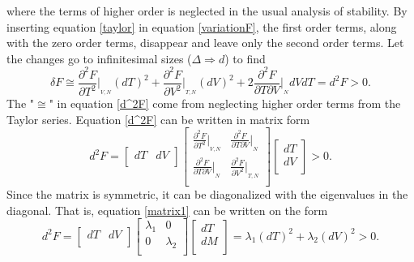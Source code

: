 where the terms of higher order is neglected in the usual analysis of stability. By inserting equation \eqref{taylor} in equation \eqref{variationF}, the first order terms, along with the zero order terms, disappear and leave only the second order terms. Let the changes go to infinitesimal sizes ($\Delta \Rightarrow d$) to find
\begin{equation}
	\delta F\cong\frac{\partial^2 F}{\partial T^2}\bigg|_{_{V,N}}(dT)^2+\frac{\partial^2 F}{\partial V^2}\bigg|_{_{T,N}}(dV)^2+2\frac{\partial^2 F}{\partial T \partial V}\bigg|_{_{N}}dVdT=d^2F > 0.
	\label{d^2F}
\end{equation} 
The "$\cong$" in equation \eqref{d^2F} come from neglecting higher order terms from the Taylor series. Equation \eqref{d^2F} can be written in matrix form
\begin{equation}
	d^2F=
	\begin{bmatrix}
		dT & dV\\
	\end{bmatrix}
	\begin{bmatrix}
		\frac{\partial^2 F}{\partial T^2}\bigg|_{_{V,N}}       & \frac{\partial^2 F}{\partial T \partial V}\bigg|_{_{N}}  \\
		\frac{\partial^2 F}{\partial T \partial V}\bigg|_{_{N}}       &
		\frac{\partial^2 F}{\partial V^2}\bigg|_{_{T,N}}
		\\
	\end{bmatrix}
	\begin{bmatrix}
		dT\\
		dV\\
	\end{bmatrix} > 0.
	\label{matrix1}
\end{equation} 
Since the matrix is symmetric, it can be diagonalized with the eigenvalues in the diagonal. That is, equation \eqref{matrix1} can be written on the form
\begin{equation}
	d^2F=
	\begin{bmatrix}
		dT & dV\\
	\end{bmatrix}
	\begin{bmatrix}
		\lambda_1       & 0  \\
		0       &
		\lambda_2
		\\
	\end{bmatrix}
	\begin{bmatrix}
		dT\\
		dM\\
	\end{bmatrix}=\lambda_1(dT)^2+\lambda_2(dV)^2 > 0.
\end{equation} 
